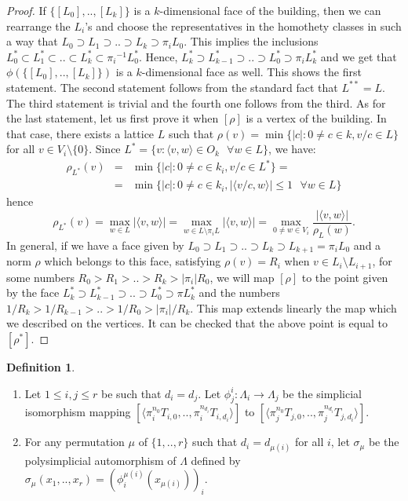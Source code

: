 \documentclass{amsart}
\theoremstyle{theorem}
\theoremstyle{lemma}
\theoremstyle{prop}
\theoremstyle{definition}
\newtheorem{definition}[lemma]{Definition}
\theoremstyle{corollary}
\theoremstyle{remark}
\begin{document}
\begin{proof}
If $\{[L_0],..,[L_k]\}$ is a $k$-dimensional face of the building, then we can rearrange the $L_i$'s and choose the representatives in the homothety classes in such a way that $L_0 \supset L_1 \supset .. \supset L_k
\supset \pi_i L_0$. This implies the inclusions $L_0^* \subset L_1^* \subset .. \subset L_k^* \subset {\pi_i}^{-1}L_0^*$. Hence, $L_k^* \supset L_{k-1}^* \supset .. \supset L_0^* \supset \pi_i L_k^*$ and we get that 
$\phi( \{[L_0],..,[L_k]\} )$ is a $k$-dimensional face as well. This shows the first statement.
The second statement follows from the standard fact that $L^{**}=L$. The third statement is trivial and the fourth one follows from the third. 
As for the last statement, let us first prove it when $[\rho]$ is a vertex of the building. In that case, there exists a lattice $L$ such that 
$\rho(v)=\min\{|c|: 0 \neq c\in k, v/c\in L\}$ for all $v \in V_i \setminus \{0\}$. Since $L^*=\{v: \langle v,w\rangle\in O_k \text{ } \forall w\in L\}$, we have: \begin{eqnarray*}
\rho_{L^*}(v)&=&\min\{|c|: 0 \neq c\in k_i, v/c\in L^*\}= \\
&=& \min\{|c|:0 \neq c\in k_i, |\langle v/c,w\rangle|\leq 1\text{ } \forall w\in L\} \end{eqnarray*}
hence
$$\rho_{L^*}(v)=\max_{w\in L}{|\langle v,w\rangle|}= \max_{w\in L \setminus \pi_i L}{|\langle v,w\rangle|} = \max_{0 \neq w\in V_i}\frac{|\langle v,w\rangle|}{\rho_L(w)}.$$
In general, if we have a face given by $L_0\supset L_1 \supset .. \supset L_k \supset L_{k+1}=\pi_i L_0$ and a norm $\rho$ which belongs to this face, satisfying $\rho(v)=R_i$ when $v\in L_i \setminus L_{i+1}$, for some numbers $R_0 > R_1 > .. > R_k > |\pi_i|R_0$, we will map $[\rho]$ to the point given by the face $L_k^* \supset L_{k-1}^* \supset .. \supset L_0^* \supset \pi L_k^*$  and the numbers $1/R_k > 1/R_{k-1} > .. > 1/R_0 > |\pi_i| / R_k$. This map extends linearly the map which we described on the vertices. It can be checked that the above point is equal to $[\rho^*]$.
\end{proof}

\begin{definition}
\label{sigma_mu}
\begin{enumerate}
\item
Let $1\leq i,j \leq r$ be such that $d_i=d_j$. Let $\phi^i_j: \Lambda_i \rightarrow \Lambda_j$ be the simplicial isomorphism mapping $[\langle \pi_i^{n_0} T_{i,0},..,\pi_i^{n_{d_i}} T_{i,d_i} \rangle]$ to $[\langle \pi_j^{n_0} T_{j,0},..,\pi_j^{n_{d_i}} T_{j,d_i} \rangle]$.
\item
For any permutation $\mu$ of $\{1,..,r\}$ such that $d_i = d_{\mu(i)}$ for all $i$, let $\sigma_\mu$ be the polysimplicial automorphism of $\Lambda$ defined by $\sigma_\mu(x_1,..,x_r) = (\phi^{\mu(i)}_i(x_{\mu(i)}))_i$.
\end{enumerate}
\end{definition}
\end{document}
